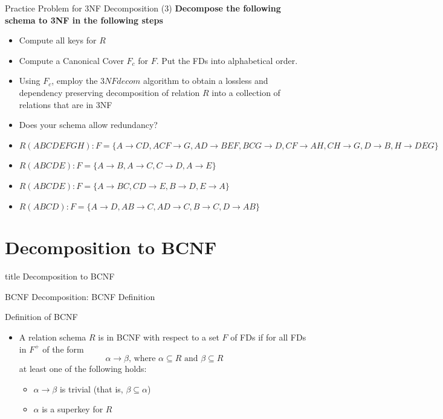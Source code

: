 \documentclass[aspectratio=169, xcolor=dvipsnames]{beamer}
\begin{document}
\begin{frame}{Practice Problem for 3NF Decomposition (3)}
    \textbf{Decompose the following schema to 3NF in the following steps}
    \begin{itemize}[<+->]
        \item Compute all keys for $R$
        \item Compute a Canonical Cover $F_c$ for $F$. Put the FDs into alphabetical order.
        \item Using $F_c$, employ the $3NFdecom$ algorithm to obtain a lossless and dependency preserving decomposition of relation $R$ into a collection of relations that are in 3NF
        \item Does your schema allow redundancy?
        \item $R(ABCDEFGH): F = \{A \rightarrow CD, ACF \rightarrow G, AD \rightarrow BEF, BCG \rightarrow D, CF \rightarrow AH, CH \rightarrow G, D \rightarrow B, H \rightarrow DEG\}$
        \item $R(ABCDE): F = \{A \rightarrow B, A \rightarrow C, C \rightarrow D, A \rightarrow E\}$
        \item $R(ABCDE): F = \{A \rightarrow BC, CD \rightarrow E, B \rightarrow D, E \rightarrow A\}$
        \item $R(ABCD): F = \{A \rightarrow D, AB \rightarrow C, AD \rightarrow C, B \rightarrow C, D \rightarrow AB\}$
    \end{itemize}
\end{frame}

\section{Decomposition to BCNF}
\begin{frame}
  \vfill
  \centering
  \begin{beamercolorbox}[sep=8pt,center,shadow=true,rounded=true]{title}
    Decomposition to BCNF\par%
  \end{beamercolorbox}
  \vfill
\end{frame}

\begin{frame}{BCNF Decomposition: BCNF Definition}
    \begin{block}{Definition of BCNF}
        \begin{itemize}[<+->]
            \item A relation schema $R$ is in BCNF with respect to a set $F$ of FDs if for all FDs in $F^+$ of the form
            \[ \alpha \rightarrow \beta \text{, where } \alpha \subseteq R \text{ and } \beta \subseteq R \]
            at least one of the following holds:
            \begin{itemize}
                \item[$\triangleright$] $\alpha \rightarrow \beta$ is trivial (that is, $\beta \subseteq \alpha$)
                \item[$\triangleright$] $\alpha$ is a superkey for $R$
            \end{itemize}
        \end{itemize}
    \end{block}
\end{frame}
\end{document}
